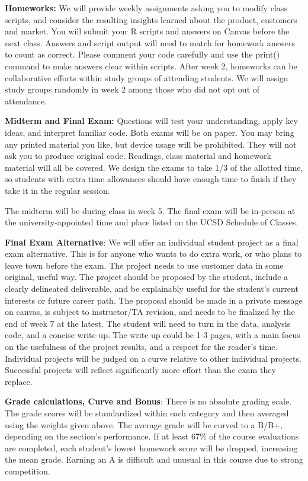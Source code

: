 \documentclass[12pt]{article}
\begin{document}
\textbf{Homeworks:} We will provide weekly assignments asking you to modify class scripts, and consider the resulting insights learned about the product, customers and market. You will submit your R scripts and answers on Canvas before the next class. Answers and script output will need to match for homework answers to count as correct. Please comment your code carefully and use the print() command to make answers clear within scripts. After week 2, homeworks can be collaborative efforts within study groups of attending students. We will assign study groups randomly in week 2 among those who did not opt out of attendance.

\textbf{Midterm and Final Exam:} Questions will test your understanding, apply key ideas, and interpret familiar code. Both exams will be on paper. You may bring any printed material you like, but device usage will be prohibited. They will not ask you to produce original code. Readings, class material and homework material will all be covered. We design the exams to take 1/3 of the allotted time, so students with extra time allowances should have enough time to finish if they take it in the regular session. 

The midterm will be during class in week 5. The final exam will be in-person at the university-appointed time and place listed on the UCSD Schedule of Classes. 

\textbf{Final Exam Alternative}: We will offer an individual student project as a final exam alternative. This is for anyone who wants to do extra work, or who plans to leave town before the exam. The project needs to use customer data in some original, useful way. The project should be proposed by the student, include a clearly delineated deliverable, and be explainably useful for the student's current interests or future career path. The proposal should be made in a private message on canvas, is subject to instructor/TA revision, and needs to be finalized by the end of week 7 at the latest. The student will need to turn in the data, analysis code, and a concise write-up. The write-up could be 1-3 pages, with a main focus on the usefulness of the project results, and a respect for the reader's time. Individual projects will be judged on a curve relative to other individual projects. Successful projects will reflect significantly more effort than the exam they replace.

\textbf{Grade calculations, Curve and Bonus}: There is no absolute grading scale. The grade scores will be standardized within each category and then averaged using the weights given above. The average grade will be curved to a B/B+, depending on the section's performance. If at least 67\% of the course evaluations are completed, each student's lowest homework score will be dropped, increasing the mean grade. Earning an A is difficult and unusual in this course due to strong competition.
\end{document}
